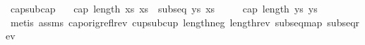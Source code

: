 \begin{isabellebody}
%
\endisadelimproof
\isanewline
\isanewline
{}\isamarkupfalse%
\ cap{\isacharunderscore}{\kern0pt}sub{\isacharunderscore}{\kern0pt}cap{\isacharcolon}{\kern0pt}\isanewline
\ \ \ {\isachardoublequoteopen}cap\ {\isacharparenleft}{\kern0pt}length\ xs{\isacharparenright}{\kern0pt}\ xs{\isachardoublequoteclose}\ \ {\isachardoublequoteopen}subseq\ ys\ xs{\isachardoublequoteclose}\isanewline
\ \ \ \ \ {\isachardoublequoteopen}cap\ {\isacharparenleft}{\kern0pt}length\ ys{\isacharparenright}{\kern0pt}\ ys{\isachardoublequoteclose}\isanewline
%
\isadelimproof
\ \ %
\endisadelimproof
%
\isatagproof
{}\isamarkupfalse%
\ {\isacharparenleft}{\kern0pt}metis\ assms{\isacharparenleft}{\kern0pt}{}{\isacharcomma}{\kern0pt}{}{\isacharparenright}{\kern0pt}\ cap{\isacharunderscore}{\kern0pt}orig{\isacharunderscore}{\kern0pt}refl{\isacharunderscore}{\kern0pt}rev\ cup{\isacharunderscore}{\kern0pt}sub{\isacharunderscore}{\kern0pt}cup\ length{\isacharunderscore}{\kern0pt}neg\ length{\isacharunderscore}{\kern0pt}rev\ subseq{\isacharunderscore}{\kern0pt}map\ subseq{\isacharunderscore}{\kern0pt}rev{\isacharparenright}{\kern0pt}%
\endisatagproof
{\isafoldproof}%
%
\isadelimproof
\isanewline
%
\endisadelimproof
%
\isadelimtheory
\isanewline
%
\endisadelimtheory
%
\isatagtheory
{}\isamarkupfalse%
%
\endisatagtheory
{\isafoldtheory}%
%
\isadelimtheory
%
\endisadelimtheory
%
\end{isabellebody}%
\endinput
